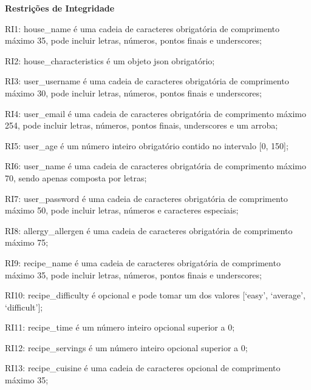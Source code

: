 \noindent\textbf{Restrições de Integridade}
\begin{description}
	\item RI1: house\_name é uma cadeia de caracteres obrigatória de comprimento máximo 35, pode incluir letras, números, pontos finais e underscores;
	\item RI2: house\_characteristics é um objeto \acrshort{json} obrigatório;
	\item RI3: user\_username é uma cadeia de caracteres obrigatória de comprimento máximo 30, pode incluir letras, números, pontos finais e underscores;
	\item RI4: user\_email é uma cadeia de caracteres obrigatória de comprimento máximo 254, pode incluir letras, números, pontos finais, underscores e um arroba;
	\item RI5: user\_age é um número inteiro obrigatório contido no intervalo [0, 150];
	\item RI6: user\_name é uma cadeia de caracteres obrigatória de comprimento máximo 70, sendo apenas composta por letras;
	\item RI7: user\_password é uma cadeia de caracteres obrigatória de comprimento máximo 50, pode incluir letras, números e caracteres especiais;
	\item RI8: allergy\_allergen é uma cadeia de caracteres obrigatória de comprimento máximo 75;
	\item RI9: recipe\_name é uma cadeia de caracteres obrigatória de comprimento máximo 35, pode incluir letras, números, pontos finais e underscores;
	\item RI10: recipe\_difficulty é opcional e pode tomar um dos valores [‘easy’, ‘average’, ‘difficult’];
	\item RI11: recipe\_time é um número inteiro opcional superior a 0;
	\item RI12: recipe\_servings é um número inteiro opcional superior a 0;
	\item RI13: recipe\_cuisine é uma cadeia de caracteres opcional de comprimento máximo 35;

\end{description}
